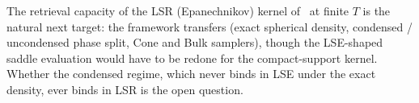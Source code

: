 \documentclass[letterpaper]{article} %
\begin{document}
The retrieval capacity of the LSR (Epanechnikov) kernel of~\citet{hoover2025dense} at finite $T$ is the natural next target: the framework transfers (exact spherical density, condensed / uncondensed phase split, Cone and Bulk samplers), though the LSE-shaped saddle evaluation would have to be redone for the compact-support kernel. Whether the condensed regime, which never binds in LSE under the exact density, ever binds in LSR is the open question.







\end{document}
